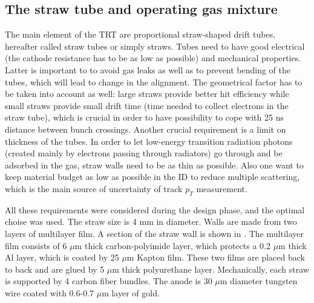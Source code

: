 
\subsection{The straw tube and operating gas mixture}

The main element of the TRT are proportional straw-shaped drift tubes, hereafter called straw tubes or simply straws.
Tubes need to have good electrical (the cathode resistance has to be as low as possible) and mechanical properties. Latter is important to to avoid gas leaks as well as to prevent bending of the tubes, which will lead to change in the alignment.
The geometrical factor has to be taken into account as well: large straws provide better hit efficiency while small straws provide small drift time (time needed to collect electrons in the straw tube), which is crucial in order to have possibility to cope with 25 ns distance between bunch crossings.
Another crucial requirement is a limit on thickness of the tubes. 
In order to let low-energy transition radiation photons (created mainly by electrons passing through radiators) go through and be adsorbed in the gas, straw walls need to be as thin as possible.
Also one want to keep material budget as low as possible in the ID to reduce multiple scattering,
which is the main source of uncertainty of track $p_T$ measurement.

All these requirements were considered during the design phase, and the optimal choise was used.
The straw size is 4 mm in diameter. Walls are made from two layers of multilayer film. A section of the straw wall is shown in .
The multilayer film consists of 6 $\mu$m thick carbon-polyimide layer, which protects a 0.2 $\mu$m thick Al layer, which is coated by 25 $\mu$m Kapton film.
These two films are placed back to back and are glued by 5 $\mu$m thick polyurethane layer.
Mechanically, each straw is supported by 4 carbon fiber bundles.
The anode is 30 $\mu$m diameter tungsten wire coated with 0.6-0.7 $\mu$m layer of gold.


